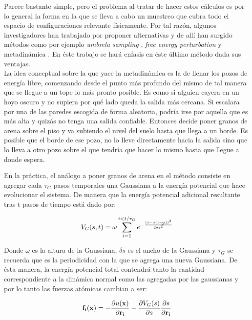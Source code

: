 \documentclass [11pt]{article}
\begin{document}
Parece bastante simple, pero el problema al tratar de hacer estos cálculos es por lo general la forma en la que se lleva a cabo un muestreo que cubra todo el espacio de configuraciones relevante físicamente. Por tal razón, algunos investigadores han trabajado por proponer alternativas y de allí han surgido métodos como por ejemplo {\it umbrela sampling} \cite{patey-valleau}, {\it free energy perturbation} \cite{bash-singh} y metadinámica \cite{laio-gervasio}. En éste trabajo se hará enfasis en éste último método dada sus ventajas. \\

La idea conceptual sobre la que yace la metadinámica es la de llenar los pozos de energía libre, comenzando desde el punto más profundo del mismo de tal manera que se llegue a un tope lo más pronto posible. Es como si alguien cayera en un hoyo oscuro y no supiera por qué lado queda la salida más cercana. Si escalara por una de las paredes escogida de forma aleatoria, podría irse por aquella que es más alta y quizás no tenga una salida confiable. Entonces decide poner granos de arena sobre el piso y va subiendo el nivel del suelo hasta que llega a un borde. Es posible que el borde de ese pozo, no lo lleve directamente hacia la salida sino que lo lleva a otro pozo sobre el que tendría que hacer lo mismo hasta que llegue a donde espera.

En la práctica, el análogo a poner granos de arena en el método consiste en agregar cada $\tau_G$ pasos temporales una Gaussiana a la energía potencial que hace evolucionar el sistema. De manera que la energía potencial adicional resultante tras t pasos de tiempo está dado por:

\begin{equation}
    V_G(s,t)=\omega\sum_{i=1}^{i<t/\tau_G}e^{-\frac{(s-s(i \tau_{\small{G}}))^2}{2\delta s^2}}
\end{equation}

Donde $\omega$ es la altura de la Gaussiana, $\delta s$ es el ancho de la Gaussiana y $\tau_G$ se recuerda que es la periodicidad con la que se agrega una nueva Gaussiana. De ésta manera, la energía potencial total contendrá tanto la cantidad correspondiente a la dinámica normal como las agregadas por las gaussianas y por lo tanto las fuerzas atómicas cambian a ser:

\begin{equation}
    {\bf f_i}({\bf x})=-\frac{\partial u({\bf x})}{\partial {\bf r_i}}-\frac{\partial V_G(s)}{\partial s}\frac{\partial s}{\partial {\bf r_i}}
\end{equation}
\end{document}
